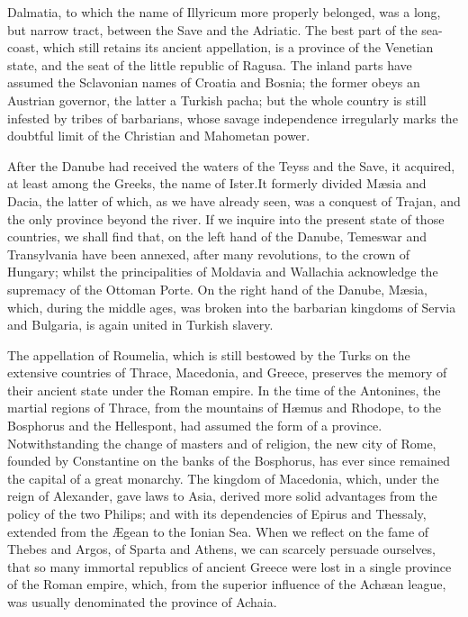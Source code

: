Dalmatia, to which the name of Illyricum more properly belonged,
was a long, but narrow tract, between the Save and the Adriatic.
The best part of the sea-coast, which still retains its ancient
appellation, is a province of the Venetian state, and the seat of
the little republic of Ragusa. The inland parts have assumed the
Sclavonian names of Croatia and Bosnia; the former obeys an
Austrian governor, the latter a Turkish pacha; but the whole
country is still infested by tribes of barbarians, whose savage
independence irregularly marks the doubtful limit of the
Christian and Mahometan power.\footnotemark[80]


After the Danube had received the waters of the Teyss and the
Save, it acquired, at least among the Greeks, the name of Ister.\footnotemark[81]
It formerly divided Mæsia and Dacia, the latter of which, as
we have already seen, was a conquest of Trajan, and the only
province beyond the river. If we inquire into the present state
of those countries, we shall find that, on the left hand of the
Danube, Temeswar and Transylvania have been annexed, after many
revolutions, to the crown of Hungary; whilst the principalities
of Moldavia and Wallachia acknowledge the supremacy of the
Ottoman Porte. On the right hand of the Danube, Mæsia, which,
during the middle ages, was broken into the barbarian kingdoms of
Servia and Bulgaria, is again united in Turkish slavery.


The appellation of Roumelia, which is still bestowed by the Turks
on the extensive countries of Thrace, Macedonia, and Greece,
preserves the memory of their ancient state under the Roman
empire. In the time of the Antonines, the martial regions of
Thrace, from the mountains of Hæmus and Rhodope, to the Bosphorus
and the Hellespont, had assumed the form of a province.
Notwithstanding the change of masters and of religion, the new
city of Rome, founded by Constantine on the banks of the
Bosphorus, has ever since remained the capital of a great
monarchy. The kingdom of Macedonia, which, under the reign of
Alexander, gave laws to Asia, derived more solid advantages from
the policy of the two Philips; and with its dependencies of
Epirus and Thessaly, extended from the Ægean to the Ionian Sea.
When we reflect on the fame of Thebes and Argos, of Sparta and
Athens, we can scarcely persuade ourselves, that so many immortal
republics of ancient Greece were lost in a single province of the
Roman empire, which, from the superior influence of the Achæan
league, was usually denominated the province of Achaia.


